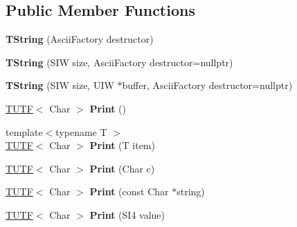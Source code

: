 \subsection*{Public Member Functions}
\begin{DoxyCompactItemize}
\item 
\mbox{\label{class___1_1_t_string_a90e5210f5b757c9abb76637c008bbe57}} 
{\bfseries T\+String} (Ascii\+Factory destructor)
\item 
\mbox{\label{class___1_1_t_string_aefb5668d73bb76f7c08e9972159862c7}} 
{\bfseries T\+String} (S\+IW size, Ascii\+Factory destructor=nullptr)
\item 
\mbox{\label{class___1_1_t_string_af42c01ab567cbef7fe4bec027ccf5959}} 
{\bfseries T\+String} (S\+IW size, U\+IW $\ast$buffer, Ascii\+Factory destructor=nullptr)
\item 
\mbox{\label{class___1_1_t_string_a81ac61ab0d314c0078d65b64e3daed4a}} 
\mbox{\hyperlink{struct___1_1_t_u_t_f}{T\+U\+TF}}$<$ Char $>$ {\bfseries Print} ()
\item 
\mbox{\label{class___1_1_t_string_a9effab6ba91e83d501aca21674e253c4}} 
{\footnotesize template$<$typename T $>$ }\\\mbox{\hyperlink{struct___1_1_t_u_t_f}{T\+U\+TF}}$<$ Char $>$ {\bfseries Print} (T item)
\item 
\mbox{\label{class___1_1_t_string_aab6602ded5c4c5e7da2e5df06b2d81d5}} 
\mbox{\hyperlink{struct___1_1_t_u_t_f}{T\+U\+TF}}$<$ Char $>$ {\bfseries Print} (Char c)
\item 
\mbox{\label{class___1_1_t_string_a2afc6f6903d6d9a8603b74a4033512c2}} 
\mbox{\hyperlink{struct___1_1_t_u_t_f}{T\+U\+TF}}$<$ Char $>$ {\bfseries Print} (const Char $\ast$string)
\item 
\mbox{\label{class___1_1_t_string_a5e635e05910d5142d106708594792178}} 
\mbox{\hyperlink{struct___1_1_t_u_t_f}{T\+U\+TF}}$<$ Char $>$ {\bfseries Print} (S\+I4 value)
\item 
\mbox{\label{class___1_1_t_string_a66754382b9205775829f2ae00a39115d}} 

\end{DoxyCompactItemize}
